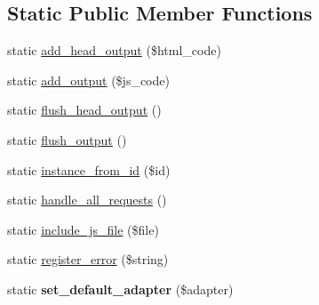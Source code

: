\subsection*{\-Static \-Public \-Member \-Functions}
\begin{DoxyCompactItemize}
\item 
static \hyperlink{class_ac_field_a9f8c3da30e3ca7ecd7dfb3fde4db81fb}{add\-\_\-head\-\_\-output} (\$html\-\_\-code)
\item 
static \hyperlink{class_ac_field_af56c9a3d1b57736159c4791c093d4405}{add\-\_\-output} (\$js\-\_\-code)
\item 
static \hyperlink{class_ac_field_aa97441469fe14a8dc413ed26c3ac8598}{flush\-\_\-head\-\_\-output} ()
\item 
static \hyperlink{class_ac_field_a62e7c97b575facfdd2bf670cf6760007}{flush\-\_\-output} ()
\item 
static \hyperlink{class_ac_field_a963c727cd73390b74c6dbcd71aa75e57}{instance\-\_\-from\-\_\-id} (\$id)
\item 
static \hyperlink{class_ac_field_ad557ab9f8715d7a1b2760ef494bba5ac}{handle\-\_\-all\-\_\-requests} ()
\item 
static \hyperlink{class_ac_field_aed7d3219717655e216e1b476c3a7551f}{include\-\_\-js\-\_\-file} (\$file)
\item 
static \hyperlink{class_ac_field_ab5947a6158c40008fd7cb3bbaad7f732}{register\-\_\-error} (\$string)
\item 
\hypertarget{class_ac_field_a08935cf11569d08c467797609fecce04}{static {\bfseries set\-\_\-default\-\_\-adapter} (\$adapter)}\label{class_ac_field_a08935cf11569d08c467797609fecce04}

\end{DoxyCompactItemize}

